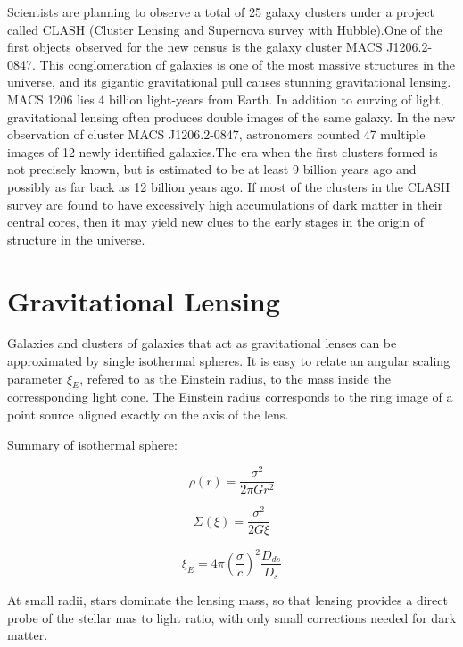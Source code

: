 Scientists are planning to observe a total of 25 galaxy clusters under a project called CLASH (Cluster Lensing and Supernova survey with Hubble).One of the first objects observed for the new census is the galaxy cluster MACS J1206.2-0847. This conglomeration of galaxies is one of the most massive structures in the universe, and its gigantic gravitational pull causes stunning gravitational lensing. MACS 1206 lies 4 billion light-years from Earth. In addition to curving of light, gravitational lensing often produces double images of the same galaxy. In the new observation of cluster MACS J1206.2-0847, astronomers counted 47 multiple images of 12 newly identified galaxies.The era when the first clusters formed is not precisely known, but is estimated to be at least 9 billion years ago and possibly as far back as 12 billion years ago. If most of the clusters in the CLASH survey are found to have excessively high accumulations of dark matter in their central cores, then it may yield new clues to the early stages in the origin of structure in the universe.


\section{Gravitational Lensing}

Galaxies and clusters of galaxies that act as gravitational lenses can be approximated by single isothermal spheres. It is easy to relate an angular scaling parameter $\xi_{E}$, refered to as the Einstein radius, to the mass inside the corressponding light cone. The Einstein radius corresponds to the ring image of a point source aligned exactly on the axis of the lens.

Summary of isothermal sphere:

\begin{equation}
\rho(r)=\frac{\sigma^2}{2\pi Gr^2}
\end{equation}

\begin{equation}
\Sigma(\xi)=\frac{\sigma^2}{2G\xi}
\end{equation}

\begin{equation}
\xi_{E}=4\pi\left(\frac{\sigma}{c}\right)^{2}\frac{D_{ds}}{D_{s}}
\end{equation}

At small radii, stars dominate the lensing mass, so that lensing provides a direct probe of the stellar mas to light ratio, with only small corrections needed for dark matter.


